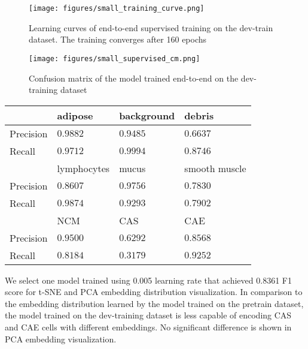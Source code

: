 \documentclass[12pt,twoside]{report}
\begin{document}
\begin{figure}
    \centering
    \texttt{[image: figures/small\_training\_curve.png]}
    \caption{Learning curves of end-to-end supervised training on the dev-train dataset. The training converges after 160 epochs}
    \label{fig:small_training_curve}
\end{figure}

\begin{figure}
    \centering
    \texttt{[image: figures/small\_supervised\_cm.png]}
    \caption{Confusion matrix of the model trained end-to-end on the dev-training dataset}
    \label{fig:small_supervised_cm}
\end{figure}

\begin{table}[]
    \centering
    \begin{tabular}{llll}
\toprule
 & adipose & background & debris \\
\hline
Precision & $0.9882$ & $0.9485$ & $0.6637$ \\
Recall & $0.9712$ & $0.9994$ & $0.8746$ \\
\toprule
 & lymphocytes & mucus & smooth muscle \\
\hline
Precision & $0.8607$ & $0.9756$ & $0.7830$ \\
Recall & $0.9874$ & $0.9293$ & $0.7902$ \\
\toprule
 & NCM & CAS & CAE \\
\hline
Precision & $0.9500$ & $0.6292$ & $0.8568$ \\
Recall & $0.8184$ & $0.3179$ & $0.9252$ \\
    \bottomrule
    \end{tabular}
    \captionsetup{type=table}
    \label{tab:small_supervised_preci_recall}
\end{table}

We select one model trained using 0.005 learning rate that achieved 0.8361 F1 score for t-SNE and PCA embedding distribution visualization. In comparison to the embedding distribution learned by the model trained on the pretrain dataset, the model trained on the dev-training dataset is less capable of encoding CAS and CAE cells with different embeddings. No significant difference is shown in PCA embedding visualization. \\
\end{document}
